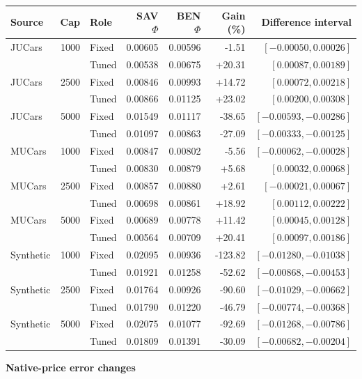 \documentclass[pdflatex,sn-nature]{sn-jnl}
\begin{document}
\begin{table}[t]
{\begin{minipage}{\linewidth}
{\begin{tabular}{lrlrrrr}
\toprule
Source & Cap & Role & SAV $\Phi$ & BEN $\Phi$ & Gain (\%) & Difference interval\\
\midrule
JUCars & 1000 & Fixed & 0.00605 & 0.00596 & -1.51 & $[-0.00050,0.00026]$\\
 &  & Tuned & 0.00538 & 0.00675 & +20.31 & $[0.00087,0.00189]$\\
\midrule
JUCars & 2500 & Fixed & 0.00846 & 0.00993 & +14.72 & $[0.00072,0.00218]$\\
 &  & Tuned & 0.00866 & 0.01125 & +23.02 & $[0.00200,0.00308]$\\
\midrule
JUCars & 5000 & Fixed & 0.01549 & 0.01117 & -38.65 & $[-0.00593,-0.00286]$\\
 &  & Tuned & 0.01097 & 0.00863 & -27.09 & $[-0.00333,-0.00125]$\\
\midrule
MUCars & 1000 & Fixed & 0.00847 & 0.00802 & -5.56 & $[-0.00062,-0.00028]$\\
 &  & Tuned & 0.00830 & 0.00879 & +5.68 & $[0.00032,0.00068]$\\
\midrule
MUCars & 2500 & Fixed & 0.00857 & 0.00880 & +2.61 & $[-0.00021,0.00067]$\\
 &  & Tuned & 0.00698 & 0.00861 & +18.92 & $[0.00112,0.00222]$\\
\midrule
MUCars & 5000 & Fixed & 0.00689 & 0.00778 & +11.42 & $[0.00045,0.00128]$\\
 &  & Tuned & 0.00564 & 0.00709 & +20.41 & $[0.00097,0.00186]$\\
\midrule
Synthetic & 1000 & Fixed & 0.02095 & 0.00936 & -123.82 & $[-0.01280,-0.01038]$\\
 &  & Tuned & 0.01921 & 0.01258 & -52.62 & $[-0.00868,-0.00453]$\\
\midrule
Synthetic & 2500 & Fixed & 0.01764 & 0.00926 & -90.60 & $[-0.01029,-0.00662]$\\
 &  & Tuned & 0.01790 & 0.01220 & -46.79 & $[-0.00774,-0.00368]$\\
\midrule
Synthetic & 5000 & Fixed & 0.02075 & 0.01077 & -92.69 & $[-0.01268,-0.00786]$\\
 &  & Tuned & 0.01809 & 0.01391 & -30.09 & $[-0.00682,-0.00204]$\\
\bottomrule
\end{tabular}}
\par\medskip\textbf{Native-price error changes}\par\smallskip
\begin{tabular}{lrlrr}


\end{tabular}
\end{minipage}}
\end{table}
\end{document}
